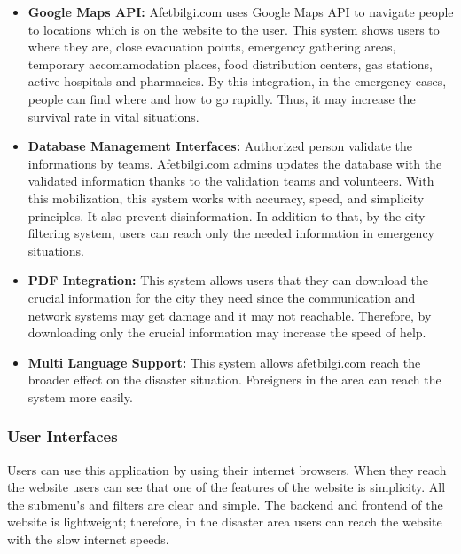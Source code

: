 \begin{itemize}
    \item \textbf{Google Maps API: } Afetbilgi.com uses Google Maps API to navigate people to locations which is on the website to the user. This system shows users to where they are, close evacuation points, emergency gathering areas, temporary accomamodation places, food distribution centers, gas stations, active hospitals and pharmacies. By this integration, in the emergency cases, people can find where and how to go rapidly. Thus, it may increase the survival rate in vital situations. 
    \item \textbf{Database Management Interfaces: } Authorized person validate the informations by teams. Afetbilgi.com admins updates the database with the validated information thanks to the validation teams and volunteers. With this mobilization, this system works with accuracy, speed, and simplicity principles. It also prevent disinformation. In addition to that, by the city filtering system, users can reach only the needed information in emergency situations. 
    \item \textbf{PDF Integration: } This system allows users that they can download the crucial information for the city they need since the communication and network systems may get damage and it may not reachable. Therefore, by downloading only the crucial information may increase the speed of help.
    \item \textbf{Multi Language Support: } This system allows afetbilgi.com reach the broader effect on the disaster situation. Foreigners in the area can reach the system more easily.
\end{itemize}

\subsubsection{User Interfaces}

Users can use this application by using their internet browsers. When they reach the website users can see that one of the features of the website is simplicity. All the submenu's and filters are clear and simple. The backend and frontend of the website is lightweight; therefore, in the disaster area users can reach the website with the slow internet speeds. 

